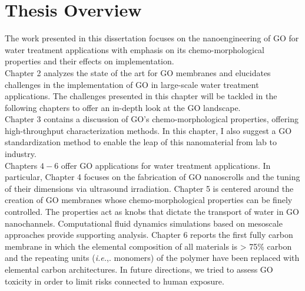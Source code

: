 \section{Thesis Overview}
The work presented in this dissertation focuses on the nanoengineering of GO for water treatment applications with emphasis on its chemo-morphological properties and their effects on implementation.\\
Chapter 2 analyzes the state of the art for GO membranes and elucidates challenges in the implementation of GO in large-scale water treatment applications. The challenges presented in this chapter will be tackled in the following chapters to offer an in-depth look at the GO landscape.\\
Chapter 3 contains a discussion of GO's chemo-morphological properties, offering high-throughput characterization methods. In this chapter, I also suggest a GO standardization method to enable the leap of this nanomaterial from lab to industry.\\
Chapters $4-6$ offer GO applications for water treatment applications. In particular, Chapter 4 focuses on the fabrication of GO nanoscrolls and the tuning of their dimensions via ultrasound irradiation. Chapter 5 is centered around the creation of GO membranes whose chemo-morphological properties can be finely controlled. The properties act as knobs that dictate the transport of water in GO nanochannels. Computational fluid dynamics simulations based on mesoscale approaches provide supporting analysis. Chapter 6 reports the first fully carbon membrane in which the elemental composition of all materials is > 75\% carbon and the repeating units (\textit{i.e.},. monomers) of the polymer have been replaced with elemental carbon architectures. In future directions, we tried to assess GO toxicity in order to limit risks connected to human exposure. 

